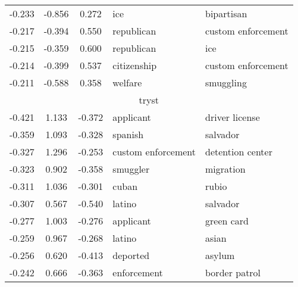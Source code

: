 \begin{tabular}{cccp{5cm}p{5cm}}
-0.233 & -0.856 & 0.272 & ice & bipartisan \\
-0.217 & -0.394 & 0.550 & republican & custom enforcement \\
-0.215 & -0.359 & 0.600 & republican & ice \\
-0.214 & -0.399 & 0.537 & citizenship & custom enforcement \\
-0.211 & -0.588 & 0.358 & welfare & smuggling \\
\midrule
\multicolumn{5}{c}{tryst}\\
-0.421 & 1.133 & -0.372 & applicant & driver license \\
-0.359 & 1.093 & -0.328 & spanish & salvador \\
-0.327 & 1.296 & -0.253 & custom enforcement & detention center \\
-0.323 & 0.902 & -0.358 & smuggler & migration \\
-0.311 & 1.036 & -0.301 & cuban & rubio \\
-0.307 & 0.567 & -0.540 & latino & salvador \\
-0.277 & 1.003 & -0.276 & applicant & green card \\
-0.259 & 0.967 & -0.268 & latino & asian \\
-0.256 & 0.620 & -0.413 & deported & asylum \\
-0.242 & 0.666 & -0.363 & enforcement & border patrol \\
\bottomrule
\end{tabular}

